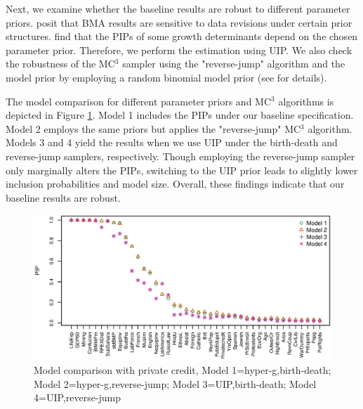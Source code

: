 \begin{refsection}
Next, we examine whether the baseline results are robust to different parameter priors. \textcite{CicconeJarocinski2010} posit that \ac{BMA} results are sensitive to data revisions under certain prior structures. \textcite{Eicheretal2011} find that the \acp{PIP} of some growth determinants depend on the chosen parameter prior. Therefore, we perform the estimation using \ac{UIP}. We also check the robustness of the MC$^{3}$ sampler using the "reverse-jump" algorithm and the model prior by employing a random binomial model prior (see \textcite{Zeugner2011} for details).

The model comparison for different parameter priors and MC$^{3}$ algorithms is depicted in Figure \ref{ch2fig:compPC}. Model 1 includes the \acp{PIP} under our baseline specification. Model 2 employs the same priors but applies the "reverse-jump" MC$^{3}$ algorithm. Models 3 and 4 yield the results when we use \ac{UIP} under the birth-death and reverse-jump samplers, respectively. Though employing the reverse-jump sampler only marginally alters the \acp{PIP}, switching to the \ac{UIP} prior leads to slightly lower inclusion probabilities and model size. Overall, these findings indicate that our baseline results are robust.

% 
\begin{figure}[!ht]
	\begin{center}
		\includegraphics[width=\linewidth]{Figures/ch2/plotCompPC6011}
		\caption{Model comparison with private credit, Model 1=hyper-g,birth-death; Model 2=hyper-g,reverse-jump; Model 3=\ac{UIP},birth-death; Model 4=\ac{UIP},reverse-jump}
		\label{ch2fig:compPC}
	\end{center}
\end{figure}
%


\end{refsection}
